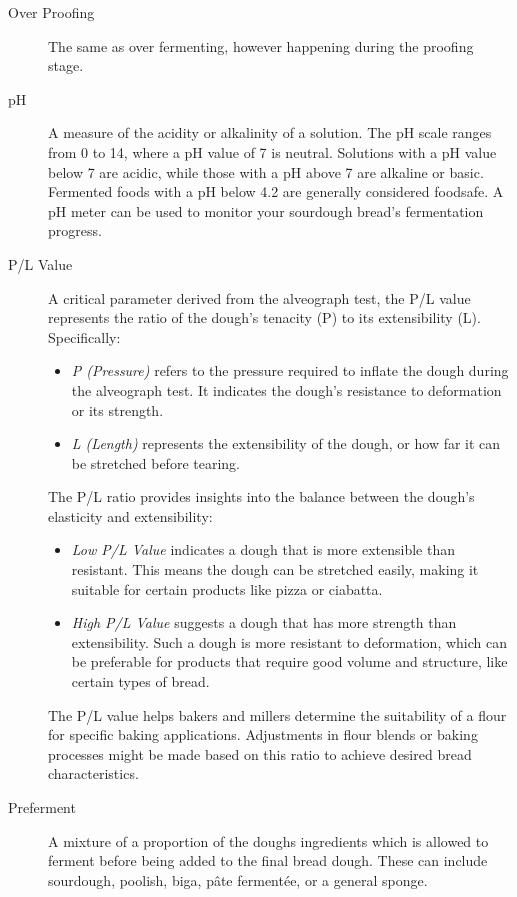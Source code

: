 \begin{description}
\item[Over Proofing] The same as over fermenting, however happening during the
proofing stage.

\item[pH] A measure of the acidity or alkalinity of a solution. The pH scale
ranges from 0 to 14, where a pH value of 7 is neutral. Solutions with a pH value below
7 are acidic, while those with a pH above 7 are alkaline or basic. Fermented
foods with a pH below 4.2 are generally considered foodsafe. A pH meter can be
used to monitor your sourdough bread's fermentation progress.

\item[P/L Value] A critical parameter derived from the alveograph test, the P/L
value represents the ratio of the dough's tenacity (P) to its extensibility (L).
Specifically:

\begin{itemize}
    \item[] \emph{P (Pressure)} refers to the pressure required to inflate the
        dough during the alveograph test. It indicates the dough's resistance
        to deformation or its strength.
    \item[] \emph{L (Length)} represents the extensibility of the dough, or
        how far it can be stretched before tearing.
\end{itemize}
The P/L ratio provides insights into the balance between the dough's elasticity and
extensibility:
%
\begin{itemize}
    \item[] \emph{Low P/L Value} indicates a dough that is more extensible
        than resistant. This means the dough can be stretched easily, making
        it suitable for certain products like pizza or ciabatta.
    \item[] \emph{High P/L Value} suggests a dough that has more strength than
        extensibility. Such a dough is more resistant to deformation, which
        can be preferable for products that require good volume and structure,
        like certain types of bread.
\end{itemize}
The P/L value helps bakers and millers determine the suitability of a flour for
specific baking applications. Adjustments in flour blends or baking processes might
be made based on this ratio to achieve desired bread characteristics.

\item[Preferment] A mixture of a proportion of the doughs ingredients which is
allowed to ferment before being added to the final bread dough. These can include
sourdough, poolish, biga, pâte fermentée, or a general sponge.


\end{description}
